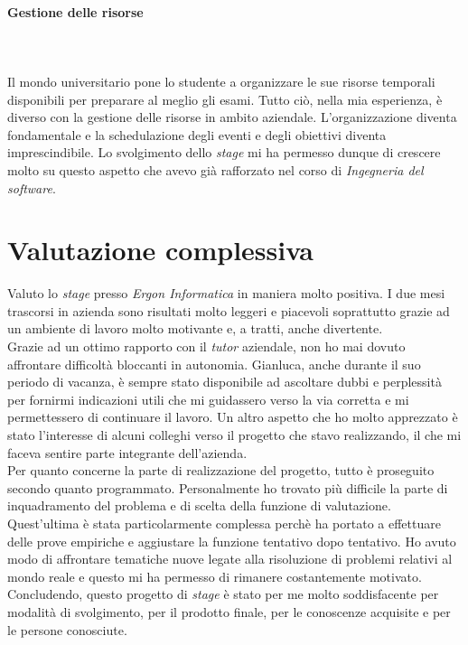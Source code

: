 \paragraph{Gestione delle risorse}\hfill\\\\
Il mondo universitario pone lo studente a organizzare le sue risorse temporali disponibili
per preparare al meglio gli esami. Tutto ciò, nella mia esperienza, è diverso con la
gestione delle risorse in ambito aziendale. L'organizzazione diventa fondamentale
e la schedulazione degli eventi e degli obiettivi diventa imprescindibile.
Lo svolgimento dello \textit{stage} mi ha permesso dunque di crescere molto su questo aspetto
che avevo già rafforzato nel corso di \textit{Ingegneria del software}.

\section{Valutazione complessiva}
\noindent Valuto lo \textit{stage} presso \textit{Ergon Informatica} in maniera molto positiva. I due mesi trascorsi in azienda sono risultati molto leggeri e piacevoli soprattutto grazie
ad un ambiente di lavoro molto motivante e, a tratti, anche divertente.\\

\noindent Grazie ad un ottimo rapporto con il \textit{\textit{tutor}} aziendale, non ho mai dovuto
affrontare difficoltà bloccanti in autonomia. Gianluca, anche durante il suo periodo di vacanza, è sempre stato disponibile
ad ascoltare dubbi e perplessità per fornirmi indicazioni utili che mi guidassero
verso la via corretta e mi permettessero di continuare il lavoro.
Un altro aspetto che ho molto apprezzato è stato l'interesse di alcuni colleghi
verso il progetto che stavo realizzando, il che mi faceva sentire parte integrante
dell'azienda.\\

\noindent Per quanto concerne la parte di realizzazione del progetto, tutto è proseguito secondo quanto programmato.
Personalmente ho trovato più difficile la parte di inquadramento del problema e di scelta della funzione di valutazione.
Quest'ultima è stata particolarmente complessa perchè ha portato a
effettuare delle prove empiriche e aggiustare la funzione tentativo dopo tentativo.
Ho avuto modo di affrontare tematiche nuove legate alla risoluzione di problemi
relativi al mondo reale e questo mi ha permesso di rimanere costantemente motivato.\\

\noindent Concludendo, questo progetto di \textit{stage} è stato per me
molto soddisfacente per modalità di svolgimento, per il prodotto finale, per le conoscenze acquisite e per le persone conosciute.